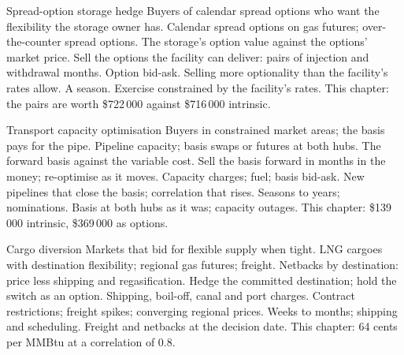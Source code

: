 \begin{strategyfile}{Spread-option storage hedge}\label{strat:s2:storage-transport-and-physical-optionality:options}
 Buyers of calendar spread options who want the flexibility the storage owner has.
 Calendar spread options on gas futures; over-the-counter spread options.
 The storage's option value against the options' market price.
 Sell the options the facility can deliver: pairs of injection and withdrawal months.
 Option bid-ask.
 Selling more optionality than the facility's rates allow.
 A season.
 Exercise constrained by the facility's rates.
 This chapter: the pairs are worth \$722\,000 against \$716\,000 intrinsic.
\end{strategyfile}

\begin{strategyfile}{Transport capacity optimisation}\label{strat:s2:storage-transport-and-physical-optionality:transport}
 Buyers in constrained market areas; the basis pays for the pipe.
 Pipeline capacity; basis swaps or futures at both hubs.
 The forward basis against the variable cost.
 Sell the basis forward in months in the money; re-optimise as it moves.
 Capacity charges; fuel; basis bid-ask.
 New pipelines that close the basis; correlation that rises.
 Seasons to years; nominations.
 Basis at both hubs as it was; capacity outages.
 This chapter: \$139\,000 intrinsic, \$369\,000 as options.
\end{strategyfile}

\begin{strategyfile}{Cargo diversion}\label{strat:s2:storage-transport-and-physical-optionality:cargo}
 Markets that bid for flexible supply when tight.
 LNG cargoes with destination flexibility; regional gas futures; freight.
 Netbacks by destination: price less shipping and regasification.
 Hedge the committed destination; hold the switch as an option.
 Shipping, boil-off, canal and port charges.
 Contract restrictions; freight spikes; converging regional prices.
 Weeks to months; shipping and scheduling.
 Freight and netbacks at the decision date.
 This chapter: 64 cents per MMBtu at a correlation of 0.8.
\end{strategyfile}

